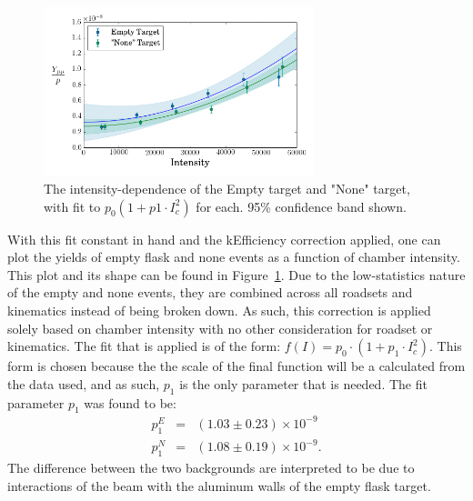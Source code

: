 \begin{figure}
	\centering
	\includegraphics[width=0.7\textwidth]{figures/analysis/rate-dep-empty.png}
	\caption{The intensity-dependence of the Empty target and "None" target, with fit to $p_0 (1+p1\cdot I_c^2)$ for each. 95\% confidence band shown.}
	\label{fig:empty-rate-dep}
\end{figure}
With this fit constant in hand and the kEfficiency correction applied, one can plot the yields of empty flask and none events as a function of chamber intensity. This plot and its shape can be found in Figure~\ref{fig:empty-rate-dep}. Due to the low-statistics nature of the empty and none events, they are combined across all roadsets and kinematics instead of being broken down. As such, this correction is applied solely based on chamber intensity with no other consideration for roadset or kinematics. The fit that is applied is of the form: $f(I) = p_0 \cdot (1 + p_1 \cdot I_c^2)$. This form is chosen because the the scale of the final function will be a calculated from the data used, and as such, $p_1$ is the only parameter that is needed. The fit parameter $p_1$ was found to be:
\begin{eqnarray}
p^E_1 & = & (1.03 \pm 0.23) \times 10^{-9} \\
p^N_1 & = & (1.08 \pm 0.19) \times 10^{-9}.
\end{eqnarray}
The difference between the two backgrounds are interpreted to be due to interactions of the beam with the aluminum walls of the empty flask target.

